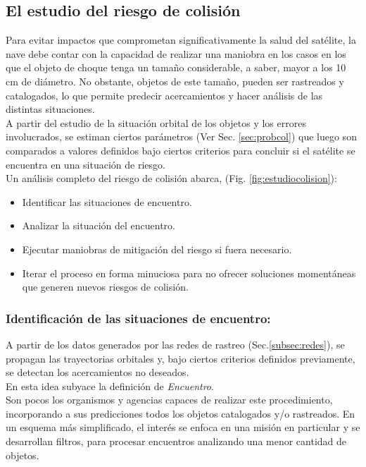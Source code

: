 \subsection{El estudio del riesgo de colisi\'on}\label{subsec:estudiocolision}

Para evitar impactos que comprometan significativamente la salud del sat\'elite, la nave debe contar con la capacidad de realizar una maniobra en los casos en los que el objeto de choque tenga un tama\~no considerable, a saber, mayor a los 10 cm de di\'ametro. No obstante, objetos de este tama\~no, pueden ser rastreados y catalogados, lo que permite predecir acercamientos y hacer an\'alisis de las distintas situaciones.\\

A partir del estudio de la situaci\'on orbital de los objetos y los errores involucrados, se estiman ciertos par\'ametros (Ver Sec. \ref{sec:probcol}) que luego son comparados a valores definidos bajo ciertos criterios para concluir si el sat\'elite se encuentra en una situaci\'on de riesgo.\\ 

Un an\'alisis completo del riesgo de colisi\'on abarca, (Fig. \ref{fig:estudiocolision}):

\begin{itemize}
\setlength{\itemsep}{0pt}
\item Identificar las situaciones de encuentro.
\item Analizar la situaci\'on del encuentro.
\item Ejecutar maniobras de mitigaci\'on del riesgo si fuera necesario.
\item Iterar el proceso en forma minuciosa para no ofrecer soluciones moment\'aneas que generen nuevos riesgos de colisi\'on.
\end{itemize}

\subsubsection*{Identificaci\'on de las situaciones de encuentro:}
A partir de los datos generados por las redes de rastreo (Sec.\ref{subsec:redes}), se propagan las trayectorias orbitales y, bajo ciertos criterios definidos previamente, se detectan los acercamientos no deseados.\\
En esta idea subyace la definici\'on de {\it{Encuentro}}.\\

Son pocos los organismos y agencias capaces de realizar este procedimiento, incorporando a sus predicciones todos los objetos catalogados y/o rastreados. En un esquema m\'as simplificado, el inter\'es se enfoca en una misi\'on en particular y se desarrollan filtros, para procesar encuentros analizando una menor cantidad de objetos.\\


